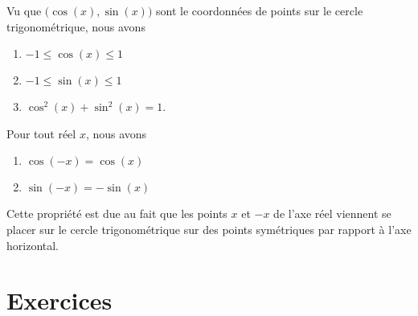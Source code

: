 \begin{propriete}
    Vu que \( \big( \cos(x),\sin(x) \big)\) sont le coordonnées de points sur le cercle trigonométrique, nous avons
    \begin{enumerate}
        \item
            \( -1\leq \cos(x)\leq 1\)
        \item
            \( -1\leq \sin(x)\leq 1\)
        \item
            \( \cos^2(x)+\sin^2(x)=1\).
    \end{enumerate}
\end{propriete}

\begin{propriete}
    Pour tout réel \( x\), nous avons
    \begin{enumerate}
        \item
            \( \cos(-x)=\cos(x)\)
        \item
        \( \sin(-x)=-\sin(x)\)
    \end{enumerate}
\end{propriete}
Cette propriété est due au fait que les points \( x\) et \( -x\) de l'axe réel viennent se placer sur le cercle trigonométrique sur des points symétriques par rapport à l'axe horizontal.

\section{Exercices}


